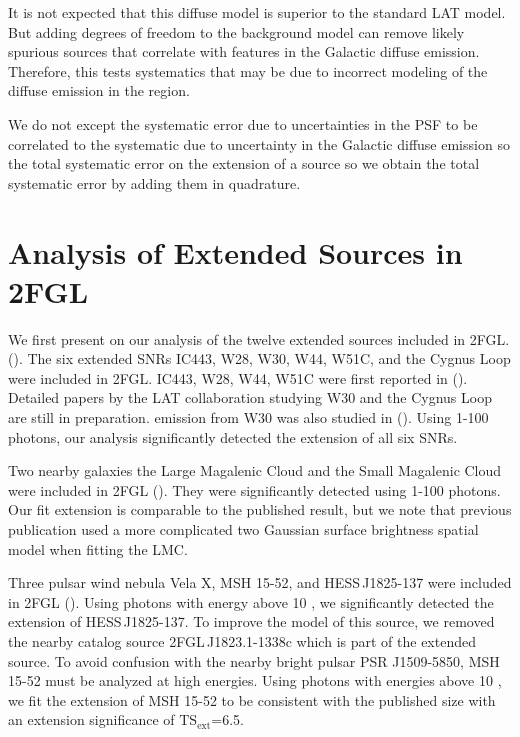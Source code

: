 \documentclass[12pt,preprint]{aastex}
\newcommand{\gev}{\text{GeV}\xspace}
\newcommand{\tsext}{{\ensuremath{\text{TS}_{\text{ext}}}}\xspace}
\begin{document}
It is not expected that this diffuse model is superior to the standard
LAT model.  But adding degrees of freedom to the background model can
remove likely spurious sources that correlate with features in the
Galactic diffuse emission.  Therefore, this tests systematics that may
be due to incorrect modeling of the diffuse emission in the region.

We do not except the systematic error due to uncertainties in the PSF to
be correlated to the systematic due to uncertainty in the Galactic diffuse
emission so the total systematic error on the extension of a source so
we obtain the total systematic error by adding them in quadrature.

\section{Analysis of Extended Sources in 2FGL}
\label{validate_known}


We first present on our analysis of the twelve extended sources
included in 2FGL.
(\cite{second_cat}).
The six extended SNRs IC443, W28, W30, W44, W51C, and the
Cygnus Loop were included in 2FGL.  IC443, W28, W44, W51C were
first reported in (\cite{ic443,w28,w44,w51c}).  Detailed papers by the LAT
collaboration studying W30 and the Cygnus Loop are still in preparation.
\gev emission from W30 was also studied in (\cite{castro_and_slane_2010}).
Using 1-100 \gev photons, our analysis significantly detected the
extension of all six SNRs.

Two nearby galaxies the Large Magalenic Cloud and the Small Magalenic
Cloud were included in 2FGL (\cite{lmc,smc}).  They were significantly
detected using 1-100 \gev photons. Our
fit extension is comparable to the published result, but we note that
previous publication used a more complicated two Gaussian surface
brightness spatial model when fitting the LMC.

Three pulsar wind nebula Vela X, MSH 15-52, and HESS\,J1825-137 were
included in 2FGL (\cite{velax,msh1552,fermi_hess_j1825}).  Using photons
with energy above 10 \gev, we significantly detected the extension of
HESS\,J1825-137.  To improve the model of this source, we removed the
nearby catalog source 2FGL\,J1823.1-1338c which is part of the extended
source.  To avoid confusion with the nearby bright pulsar PSR J1509-5850, MSH 15-52 must be
analyzed at high energies.  Using photons with energies above 10 \gev,
we fit the extension of MSH 15-52 to be consistent with the published
size with an extension significance of \tsext=6.5.  
\end{document}
